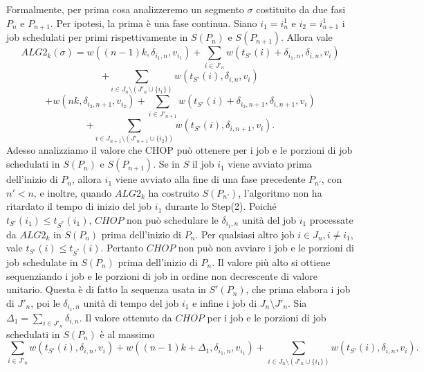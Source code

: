 \documentclass[12pt]{article}
\begin{document}
Formalmente, per prima cosa analizzeremo un segmento $\sigma$ costituito da due fasi $P_{n}$ e $P_{n + 1}$.
Per ipotesi, la prima è una fase continua. Siano $i_{1} = i_{n}^{1}$ e $i_{2} = i_{n+1}^{1}$ i job schedulati per primi rispettivamente in $S(P_{n})$ e $S(P_{n + 1})$. Allora vale
\begin{equation}
ALG2_{k}(\sigma) = w ((n - 1)k, \delta_{i_{1},n}, v_{i_{1}}) + \sum_{i \in J'_{n}} w(t_{S'}(i) + \delta_{i_{1},n}, \delta_{i,n}, v_{i}) \tag*{(4)}
\end{equation}
$$+ \sum_{i \in J_{n} \setminus (J'_{n} \cup \{i_{1}\})} w (t_{S'} (i), \delta_{i,n}, v_{i})$$
\begin{equation}
+ w (nk, \delta_{i_{2}, n+1}, v_{i_{2}}) + \sum_{i \in J'_{n+1}} w(t_{S'} (i) + \delta_{i_{2}, n+1}, \delta_{i,n+1}, v_{i}) \tag*{(5)}
\end{equation}
$$+ \sum_{i \in J_{n+1} \setminus (J'_{n+1} \cup \{i_{2}\})} w (t_{S'} (i), \delta_{i,n+1}, v_{i}).$$
Adesso analizziamo il valore che CHOP può ottenere per i job e le porzioni di job schedulati in $S(P_{n})$ e $S(P_{n + 1})$. Se in $S$ il job $i_{1}$ viene avviato prima dell'inizio di $P_{n}$, allora $i_{1}$ viene avviato alla fine di una fase precedente $P_{n'}$, con $n' < n$, e inoltre, quando $ALG2_{k}$ ha costruito $S(P_{n'})$, l'algoritmo non ha ritardato il tempo di inizio del job $i_{1}$ durante lo Step(2). Poiché $t_{S'} (i_{1}) \leq t_{S^{*}}(i_{1})$, $CHOP$ non può schedulare le $\delta_{i_{1},n}$ unità del job $i_{1}$ processate da $ALG2_{k}$ in $S(P_{n})$ prima dell'inizio di $P_{n}$. Per qualsiasi altro job $i \in J_{n}, i \neq i_{1}$, vale $t_{S'}(i) \leq t_{S^{*}} (i)$. Pertanto $CHOP$ non può non avviare i job e le porzioni di job schedulate in $S(P_{n})$ prima dell'inizio di $P_{n}$. Il valore più alto si ottiene sequenziando i job e le porzioni di job in ordine non decrescente di valore unitario. Questa è di fatto la sequenza usata in $S'(P_{n})$, che prima elabora i job di $J'_{n}$, poi le  $\delta_{i_{1},n}$ unità di tempo del job $i_{1}$ e infine i job di $J_{n} \setminus J'_{n}$. Sia 
$\Delta_{1} = \sum_{i \in J'_{n}} \delta_{i,n}$. Il valore ottenuto da $CHOP$ per i job e le porzioni di job schedulati in $S(P_{n})$ è al massimo
$$ \sum_{i \in J'_{n}} w(t_{S'}(i), \delta_{i,n}, v_{i}) + w ((n - 1) k + \Delta_{1}, \delta_{i_{1},n}, v_{i_{1}}) + \sum_{i \in J_{n} \setminus (J'_{n}\cup \{i_{1}\})} w (t_{S'} (i), \delta_{i,n},v_{i}).$$
\end{document}
